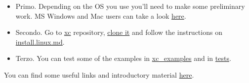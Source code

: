 \begin{itemize}
\item Primo. Depending on the OS you use you'll need to make some preliminary work. MS Windows and Mac users can take a look \href{https://github.com/xcfem/xc/blob/master/install/install.md}{here}.
\item Secondo. Go to \href{https://github.com/xcfem/xc}{xc} repository, \href{https://www.howtogeek.com/428988/how-to-install-software-using-git-on-linux}{clone it} and follow the instructions on \href{https://github.com/xcfem/xc/blob/master/install/install.linux.md}{install.linux.md}.
\item Terzo. You can test some of the examples in \href{https://github.com/xcfem/xc_examples}{xc\_examples} and in \href{https://github.com/xcfem/xc/tree/master/verif/tests}{tests}.
\end{itemize}

You can find some useful links and introductory material \href{https://github.com/xcfem/xc/blob/master/doc/how_to_start.md}{here}.




